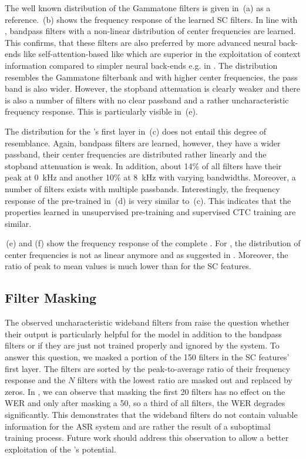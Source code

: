 \documentclass{INTERSPEECH2023}
\begin{document}
The well known distribution of the Gammatone filters is given in \,(a) as a reference.
\,(b) shows the frequency response of the learned \gls{SC} filters.
In line with \cite{tuske2018:waveform}, bandpass filters with a non-linear distribution of center frequencies are learned.
This confirms, that these filters are also preferred by more advanced neural back-ends like self-attention-based like \conformer which are superior in the exploitation of context information compared to simpler neural back-ends e.g. in \cite{tuske2014raw}.
The distribution resembles the Gammatone filterbank and with higher center frequencies, the pass band is also wider.
However, the stopband attenuation is clearly weaker and there is also a number of filters with no clear passband and a rather uncharacteristic frequency response.
This is particularly visible in \,(e).

The distribution for the \wvtwo \fe's first layer in \,(c) does not entail this degree of resemblance.
Again, bandpass filters are learned, however, they have a wider passband, their center frequencies are distributed rather linearly and the stopband attenuation is weak.
In addition, about 14\% of all filters have their peak at \SI{0}{\kilo\hertz} and another 10\% at \SI{8}{\kilo\hertz} with varying bandwidths.
Moreover, a number of filters exists with multiple passbands.
Interestingly, the frequency response of the pre-trained \wvtwo \fe in \,(d) is very similar to \,(c).
This indicates that the properties learned in unsupervised pre-training and supervised \gls{CTC} training are similar.

\,(e) and (f) show the frequency response of the complete \fe.
For \wvtwo, the distribution of center frequencies is not as linear anymore and as suggested in \cite{choi2022w2v2fe}.
Moreover, the ratio of peak to mean values is much lower than for the \gls{SC} features.

\subsection{Filter Masking}

The observed uncharacteristic wideband filters from  raise the question whether their output is particularly helpful for the model in addition to the bandpass filters or if they are just not trained properly and ignored by the system.
To answer this question, we masked a portion of the 150 filters in the \gls{SC} features' first layer.
The filters are sorted by the peak-to-average ratio of their frequency response and the $N$ filters with the lowest ratio are masked out and replaced by zeros.
In , we can observe that masking the first 20 filters has no effect on the \gls{WER} and only after masking a 50, so a third of all filters, the \gls{WER} degrades significantly.
This demonstrates that the wideband filters do not contain valuable information for the \gls{ASR} system and are rather the result of a suboptimal training process.
Future work should address this observation to allow a better exploitation of the \fe's potential.
\end{document}
